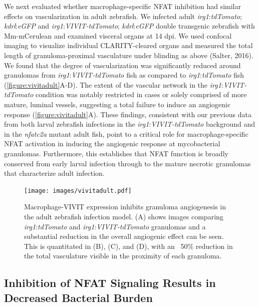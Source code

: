 We next evaluated whether macrophage-specific NFAT inhibition had similar effects on vascularization in adult zebrafish. We infected adult \textit{irg1}:\textit{tdTomato}; \textit{kdrl}:\textit{eGFP} and \textit{irg1}:\textit{VIVIT-tdTomato}; \textit{kdrl}:\textit{eGFP} double transgenic zebrafish with Mm-mCerulean and examined visceral organs at 14 dpi. We used confocal imaging to visualize individual CLARITY-cleared organs and measured the total length of granuloma-proximal vasculature under blinding as above (Salter, 2016). We found that the degree of vascularization was significantly reduced around granulomas from \textit{irg1}:\textit{VIVIT-tdTomato} fish as compared to \textit{irg1}:\textit{tdTomato} fish (\autoref{figure:vivitadult}A-D). The extent of the vascular network in the \textit{irg1}:\textit{VIVIT-tdTomato} condition was notably restricted in cases or solely comprised of more mature, luminal vessels, suggesting a total failure to induce an angiogenic response (\autoref{figure:vivitadult}A). These findings, consistent with our previous data from both larval zebrafish infections in the \textit{irg1}:\textit{VIVIT-tdTomato} background and in the \textit{nfatc2a} mutant adult fish, point to a critical role for macrophage-specific NFAT activation in inducing the angiogenic response at mycobacterial granulomas. Furthermore, this establishes that NFAT function is broadly conserved from early larval infection through to the mature necrotic granulomas that characterize adult infection.

\begin{figure}
\centering
\texttt{[image: images/vivitadult.pdf]}
\caption{Macrophage-VIVIT expression inhibits granuloma angiogenesis in the adult zebrafish infection model. (A) shows images comparing \textit{irg1}:\textit{tdTomato} and \textit{irg1}:\textit{VIVIT-tdTomato} granulomas and a substantial reduction in the overall angiogenic effect can be seen. This is quantitated in (B), (C), and (D), with an ~50\% reduction in the total vasculature visible in the proximity of each granuloma.}
\label{figure:vivitadult}
\end{figure}

\subsection{Inhibition of NFAT Signaling Results in Decreased Bacterial Burden}

